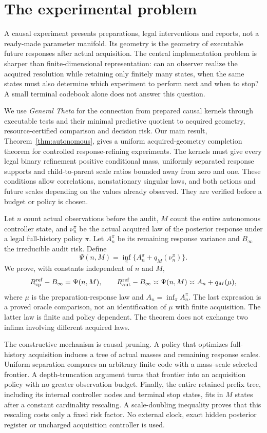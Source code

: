\section{The experimental problem}\label{sec:problem}
A causal experiment presents preparations, legal interventions and reports, not a ready-made parameter manifold. Its geometry is the geometry of executable future responses after actual acquisition. The central implementation problem is sharper than finite-dimensional representation: can an observer realize the acquired resolution while retaining only finitely many states, when the same states must also determine which experiment to perform next and when to stop? A small terminal codebook alone does not answer this question.

We use \emph{General Theta} for the connection from prepared causal kernels through executable tests and their minimal predictive quotient to acquired geometry, resource-certified comparison and decision risk. Our main result, Theorem~\ref{thm:autonomous}, gives a uniform acquired-geometry completion theorem for controlled response-refining experiments. The kernels must give every legal binary refinement positive conditional mass, uniformly separated response supports and child-to-parent scale ratios bounded away from zero and one. These conditions allow correlations, nonstationary singular laws, and both actions and future scales depending on the values already observed. They are verified before a budget or policy is chosen.

Let $n$ count actual observations before the audit, $M$ count the entire autonomous controller state, and $\nu_n^\pi$ be the actual acquired law of the posterior response under a legal full-history policy $\pi$. Let $A_n^\pi$ be its remaining response variance and $B_\infty$ the irreducible audit risk. Define
\[
 \Psi(n,M)=\inf_\pi\{A_n^\pi+q_M(\nu_n^\pi)\}.
\]
We prove, with constants independent of $n$ and $M$,
\[
 R_{\rm cp}^{\rm ref}-B_\infty=\Psi(n,M),\qquad
 R_{\rm aut}^{\rm ref}-B_\infty\asymp\Psi(n,M)
                    \asymp A_n+q_M(\mu),
\]
where $\mu$ is the preparation-response law and $A_n=\inf_\pi A_n^\pi$. The last expression is a proved oracle comparison, not an identification of $\mu$ with finite acquisition. The latter law is finite and policy dependent. The theorem does not exchange two infima involving different acquired laws.

The constructive mechanism is causal pruning. A policy that optimizes full-history acquisition induces a tree of actual masses and remaining response scales. Uniform separation compares an arbitrary finite code with a mass--scale selected frontier. A depth-truncation argument turns that frontier into an acquisition policy with no greater observation budget. Finally, the entire retained prefix tree, including its internal controller nodes and terminal stop states, fits in $M$ states after a constant cardinality rescaling. A scale-doubling inequality proves that this rescaling costs only a fixed risk factor. No external clock, exact hidden posterior register or uncharged acquisition controller is used.

